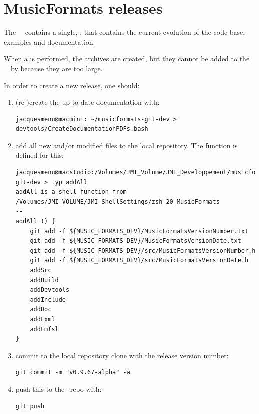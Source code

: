 \chapter{MusicFormats releases}\label{MusicFormats releases}

The \mf\ \repo\ contains a single, \masterBranch, that contains the current evolution of the code base, examples and documentation.

When a  is performed, the  archives are created, but they cannot be added to the \mf\ \repo\ by \github\. because they are too large.

In order to create a new release, one should:
\begin{enumerate}
\item (re-)create the up-to-date documentation with:
\begin{lstlisting}[language=TerminalSmall]
jacquesmenu@macmini: ~/musicformats-git-dev > devtools/CreateDocumentationPDFs.bash
\end{lstlisting}


\item add all new and/or modified files to the local repository. The  function is defined for this:
\begin{lstlisting}[language=Terminal]
jacquesmenu@macstudio:/Volumes/JMI_Volume/JMI_Developpement/musicformats-git-dev > typ addAll
addAll is a shell function from /Volumes/JMI_VOLUME/JMI_ShellSettings/zsh_20_MusicFormats
--
addAll () {
	git add -f ${MUSIC_FORMATS_DEV}/MusicFormatsVersionNumber.txt
	git add -f ${MUSIC_FORMATS_DEV}/MusicFormatsVersionDate.txt
	git add -f ${MUSIC_FORMATS_DEV}/src/MusicFormatsVersionNumber.h
	git add -f ${MUSIC_FORMATS_DEV}/src/MusicFormatsVersionDate.h
	addSrc
	addBuild
	addDevtools
	addInclude
	addDoc
	addFxml
	addFmfsl
}
\end{lstlisting}


\item commit to the local repository clone with the release version number:
\begin{lstlisting}[language=Terminal]
git commit -m "v0.9.67-alpha" -a
\end{lstlisting}


\item push this to the \mf\ repo with:
\begin{lstlisting}[language=Terminal]
git push
\end{lstlisting}



\end{enumerate}
